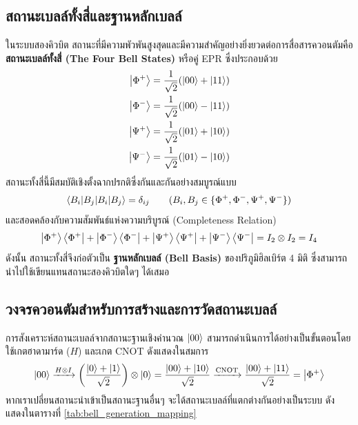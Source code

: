 \subsection{สถานะเบลล์ทั้งสี่และฐานหลักเบลล์}
ในระบบสองคิวบิต สถานะที่มีความพัวพันสูงสุดและมีความสำคัญอย่างยิ่งยวดต่อการสื่อสารควอนตัมคือ \textbf{สถานะเบลล์ทั้งสี่ (The Four Bell States)} หรือคู่ EPR ซึ่งประกอบด้วย
\begin{align}
\ket{\Phi^+} &= \frac{1}{\sqrt{2}} (\ket{00} + \ket{11}) \label{eq:bell_phi_p} \\
\ket{\Phi^-} &= \frac{1}{\sqrt{2}} (\ket{00} - \ket{11}) \label{eq:bell_phi_m} \\
\ket{\Psi^+} &= \frac{1}{\sqrt{2}} (\ket{01} + \ket{10}) \label{eq:bell_psi_p} \\
\ket{\Psi^-} &= \frac{1}{\sqrt{2}} (\ket{01} - \ket{10}) \label{eq:bell_psi_m}
\end{align}
สถานะทั้งสี่นี้มีสมบัติเชิงตั้งฉากปรกติซึ่งกันและกันอย่างสมบูรณ์แบบ
\begin{equation}
\braket{B_i | B_j} = \delta_{ij} \qquad (B_i, B_j \in \{\Phi^+, \Phi^-, \Psi^+, \Psi^-\})
\end{equation}
และสอดคล้องกับความสัมพันธ์แห่งความบริบูรณ์ (Completeness Relation)
\begin{equation}
\ket{\Phi^+}\bra{\Phi^+} + \ket{\Phi^-}\bra{\Phi^-} + \ket{\Psi^+}\bra{\Psi^+} + \ket{\Psi^-}\bra{\Psi^-} = I_2 \otimes I_2 = I_4
\end{equation}
ดังนั้น สถานะทั้งสี่จึงก่อตัวเป็น \textbf{ฐานหลักเบลล์ (Bell Basis)} ของปริภูมิฮิลเบิร์ต 4 มิติ ซึ่งสามารถนำไปใช้เขียนแทนสถานะสองคิวบิตใดๆ ได้เสมอ

\subsection{วงจรควอนตัมสำหรับการสร้างและการวัดสถานะเบลล์}
การสังเคราะห์สถานะเบลล์จากสถานะฐานเชิงคำนวณ $\ket{00}$ สามารถดำเนินการได้อย่างเป็นขั้นตอนโดยใช้เกตฮาดามาร์ด ($H$) และเกต CNOT ดังแสดงในสมการ
\begin{equation}
\ket{00} \xrightarrow{H \otimes I} \left( \frac{\ket{0} + \ket{1}}{\sqrt{2}} \right) \otimes \ket{0} = \frac{\ket{00} + \ket{10}}{\sqrt{2}} \xrightarrow{\text{CNOT}} \frac{\ket{00} + \ket{11}}{\sqrt{2}} = \ket{\Phi^+}
\end{equation}
หากเราเปลี่ยนสถานะนำเข้าเป็นสถานะฐานอื่นๆ จะได้สถานะเบลล์ที่แตกต่างกันอย่างเป็นระบบ ดังแสดงในตารางที่ \ref{tab:bell_generation_mapping}


